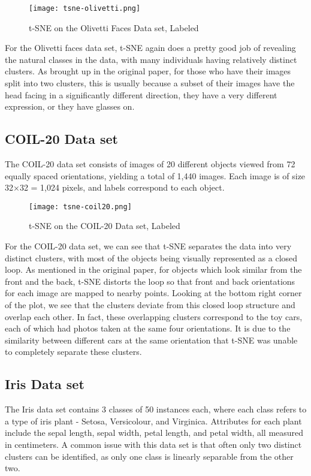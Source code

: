 \documentclass{article}
\begin{document}
\begin{figure}[H]
\caption{t-SNE on the Olivetti Faces Data set, Labeled}
\centering
\texttt{[image: tsne-olivetti.png]}
\end{figure}

For the Olivetti faces data set, t-SNE again does a pretty good job of revealing the natural classes in the data, with many individuals having relatively distinct clusters. As brought up in the original paper, for those who have their images split into two clusters, this is usually because a subset of their images have the head facing in a significantly different direction, they have a very different expression, or they have glasses on.

\newpage
\subsection*{COIL-20 Data set}

The COIL-20 data set consists of images of 20 different objects viewed from 72 equally spaced orientations, yielding a total of 1,440 images. Each image is of size 32×32 = 1,024 pixels, and labels correspond to each object.

\begin{figure}[H]
\caption{t-SNE on the COIL-20 Data set, Labeled}
\centering
\texttt{[image: tsne-coil20.png]}
\end{figure}

For the COIL-20 data set, we can see that t-SNE separates the data into very distinct clusters, with most of the objects being visually represented as a closed loop. As mentioned in the original paper, for objects which look similar from the front and the back, t-SNE distorts the loop so that front and back orientations for each image are mapped to nearby points. Looking at the bottom right corner of the plot, we see that the clusters deviate from this closed loop structure and overlap each other. In fact, these overlapping clusters correspond to the toy cars, each of which had photos taken at the same four orientations. It is due to the similarity between different cars at the same orientation that t-SNE was unable to completely separate these clusters.

\newpage
\subsection*{Iris Data set}

The Iris data set contains 3 classes of 50 instances each, where each class refers to a type of iris plant - Setosa, Versicolour, and Virginica. Attributes for each plant include the sepal length, sepal width, petal length, and petal width, all measured in centimeters. A common issue with this data set is that often only two distinct clusters can be identified, as only one class is linearly separable from the other two.
\end{document}
